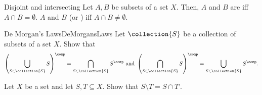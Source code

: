 \begin{dfn}{Disjoint and intersecting}{}
Let $A,B$ be subsets of a set $X$.  Then, $A$ and $B$ are  iff $A\cap B=\emptyset$.  $A$ and $B$  (or ) iff $A\cap B\neq \emptyset$.
\end{dfn}
\begin{exr}{De Morgan's Laws}{DeMorgansLaws}
Let $\collection{S}$ be a collection of subsets of a set $X$.  Show that
\begin{equation}
\left( \bigcup _{S\in \collection{S}}S\right) ^{\comp}=\bigcap _{S\in \collection{S}}S^{\comp}\text{ and }\left( \bigcap _{S\in \collection{S}}S\right) ^{\comp}=\bigcup _{S\in \collection{S}}S^{\comp}.
\end{equation}
\end{exr}
\begin{exr}{}{}
Let $X$ be a set and let $S,T\subseteq X$.  Show that $S\setminus T=S\cap T^{\comp}$.
\end{exr}

